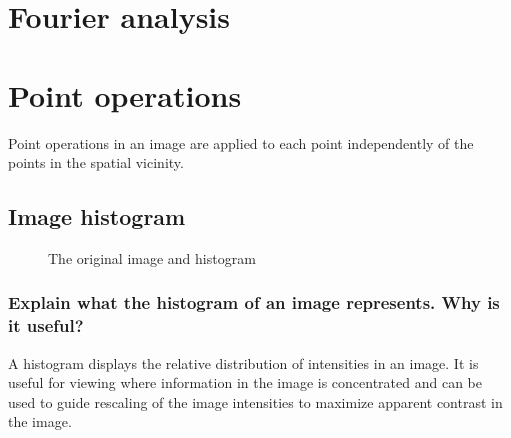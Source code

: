 \documentclass[article, 1.5space, letterpaper, 12pt, oneside, header, footer]{SydeClass}
\begin{document}
\clearpage
\section{Fourier analysis}

\section{Point operations}

Point operations in an image are applied to each point independently of the points in the spatial vicinity.

\subsection{Image histogram}

\begin{figure}[ht]
\centering
	\caption{The original image and histogram}
	\label{fig:hist-original}
\end{figure}

\subsubsection{Explain what the histogram of an image represents. Why is it useful?}

A histogram displays the relative distribution of intensities in an image. It is useful for viewing where information in the image is concentrated and can be used to guide rescaling of the image intensities to maximize apparent contrast in the image.
\end{document}
